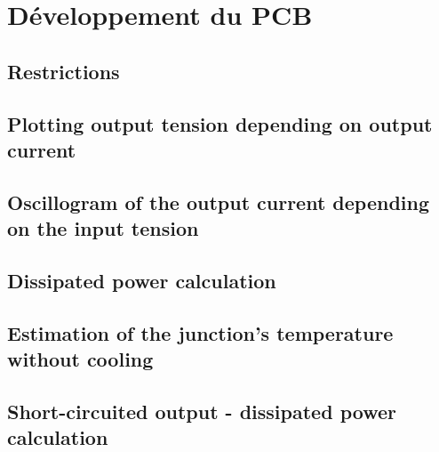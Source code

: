 \section{Développement du PCB}
\subsection{Restrictions} \label{ssec:num21}
{}
\subsection{Plotting output tension depending on output current} \label{ssec:num22}
{}
\subsection{Oscillogram of the output current depending on the input tension} \label{ssec:num13}
{}
\subsection{Dissipated power calculation} \label{ssec:num24}
{}
\subsection{Estimation of the junction's temperature without cooling} \label{ssec:num25}
{}
\subsection{Short-circuited output - dissipated power calculation} \label{ssec:num26}
{}
\clearpage